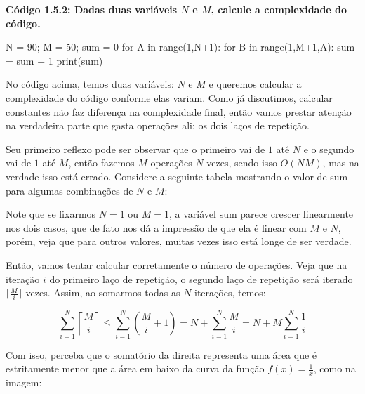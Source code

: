 \documentclass[11pt, a4paper]{article}
\begin{document}
\textbf{Código 1.5.2: Dadas duas variáveis \(N\) e \(M\), calcule a complexidade do código.}

\begin{code}
N = 90; M = 50; sum = 0
for A in range(1,N+1):
    for B in range(1,M+1,A):
        sum = sum + 1
print(sum)
\end{code}

No código acima, temos duas variáveis: \(N\) e \(M\) e queremos calcular a complexidade do código conforme elas variam. Como já discutimos, calcular constantes não faz diferença na complexidade final, então vamos prestar atenção na verdadeira parte que gasta operações ali: os dois laços de repetição.

Seu primeiro reflexo pode ser observar que o primeiro vai de \(1\) até \(N\) e o segundo vai de \(1\) até \(M\), então fazemos \(M\) operações \(N\) vezes, sendo isso \(O(NM)\), mas na verdade isso está errado. Considere a seguinte tabela mostrando o valor de sum para algumas combinações de \(N\) e \(M\):


Note que se fixarmos \(N=1\) ou \(M=1\), a variável sum parece crescer linearmente nos dois casos, que de fato nos dá a impressão de que ela é linear com \(M\) e \(N\), porém, veja que para outros valores, muitas vezes isso está longe de ser verdade.

Então, vamos tentar calcular corretamente o número de operações. Veja que na iteração \(i\) do primeiro laço de repetição, o segundo laço de repetição será iterado \(\lceil\frac{M}{i}\rceil\) vezes. Assim, ao somarmos todas as \(N\) iterações, temos:

\void[-0.5]

\[\sum_{i=1}^{N}\left\lceil\frac{M}{i}\right\rceil \leq \sum_{i=1}^{N}\left(\frac{M}{i}+1\right)=N+\sum_{i=1}^{N}\frac{M}{i}=N+M\sum_{i=1}^{N}\frac{1}{i}\]

Com isso, perceba que o somatório da direita representa uma área que é estritamente menor que a área em baixo da curva da função \(f(x)=\frac{1}{x}\), como na imagem:
\end{document}
